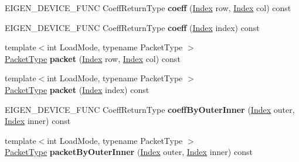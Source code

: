 \begin{DoxyCompactItemize}
E\+I\+G\+E\+N\+\_\+\+D\+E\+V\+I\+C\+E\+\_\+\+F\+U\+NC Coeff\+Return\+Type {\bfseries coeff} (\hyperlink{namespace_eigen_a62e77e0933482dafde8fe197d9a2cfde}{Index} row, \hyperlink{namespace_eigen_a62e77e0933482dafde8fe197d9a2cfde}{Index} col) const
\item 
\mbox{\label{class_eigen_1_1internal_1_1redux__evaluator_ab0980858a25500e1c8fe8ce59960500a}} 
E\+I\+G\+E\+N\+\_\+\+D\+E\+V\+I\+C\+E\+\_\+\+F\+U\+NC Coeff\+Return\+Type {\bfseries coeff} (\hyperlink{namespace_eigen_a62e77e0933482dafde8fe197d9a2cfde}{Index} index) const
\item 
\mbox{\label{class_eigen_1_1internal_1_1redux__evaluator_a472d69c66fe1edee728666b67ebc401c}} 
{\footnotesize template$<$int Load\+Mode, typename Packet\+Type $>$ }\\\hyperlink{struct_eigen_1_1_packet_type}{Packet\+Type} {\bfseries packet} (\hyperlink{namespace_eigen_a62e77e0933482dafde8fe197d9a2cfde}{Index} row, \hyperlink{namespace_eigen_a62e77e0933482dafde8fe197d9a2cfde}{Index} col) const
\item 
\mbox{\label{class_eigen_1_1internal_1_1redux__evaluator_a433d7cdb229ff7568e0d68b74b87985c}} 
{\footnotesize template$<$int Load\+Mode, typename Packet\+Type $>$ }\\\hyperlink{struct_eigen_1_1_packet_type}{Packet\+Type} {\bfseries packet} (\hyperlink{namespace_eigen_a62e77e0933482dafde8fe197d9a2cfde}{Index} index) const
\item 
\mbox{\label{class_eigen_1_1internal_1_1redux__evaluator_a6d56217446293557a7b21754181fce85}} 
E\+I\+G\+E\+N\+\_\+\+D\+E\+V\+I\+C\+E\+\_\+\+F\+U\+NC Coeff\+Return\+Type {\bfseries coeff\+By\+Outer\+Inner} (\hyperlink{namespace_eigen_a62e77e0933482dafde8fe197d9a2cfde}{Index} outer, \hyperlink{namespace_eigen_a62e77e0933482dafde8fe197d9a2cfde}{Index} inner) const
\item 
\mbox{\label{class_eigen_1_1internal_1_1redux__evaluator_a438feca81b1846945bad96d2198b4bac}} 
{\footnotesize template$<$int Load\+Mode, typename Packet\+Type $>$ }\\\hyperlink{struct_eigen_1_1_packet_type}{Packet\+Type} {\bfseries packet\+By\+Outer\+Inner} (\hyperlink{namespace_eigen_a62e77e0933482dafde8fe197d9a2cfde}{Index} outer, \hyperlink{namespace_eigen_a62e77e0933482dafde8fe197d9a2cfde}{Index} inner) const

\end{DoxyCompactItemize}
